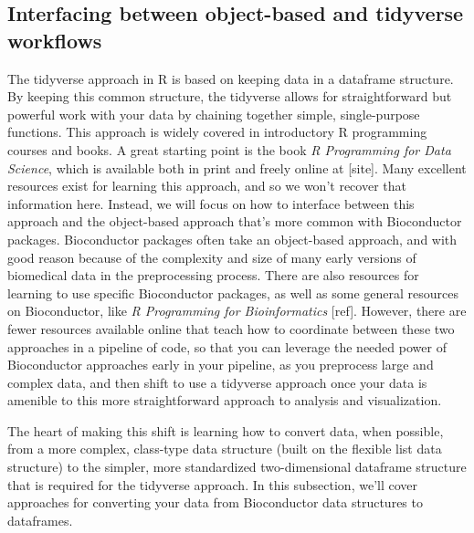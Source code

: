 \documentclass[]{tufte-book}
\begin{document}
\hypertarget{interfacing-between-object-based-and-tidyverse-workflows}{%
\subsection{Interfacing between object-based and tidyverse workflows}\label{interfacing-between-object-based-and-tidyverse-workflows}}

The tidyverse approach in R is based on keeping data in a dataframe structure.
By keeping this common structure, the tidyverse allows for straightforward but
powerful work with your data by chaining together simple, single-purpose
functions. This approach is widely covered in introductory R programming courses
and books. A great starting point is the book \emph{R Programming for Data Science},
which is available both in print and freely online at {[}site{]}. Many excellent
resources exist for learning this approach, and so we won't recover that
information here. Instead, we will focus on how to interface between this
approach and the object-based approach that's more common with Bioconductor
packages. Bioconductor packages often take an object-based approach, and with
good reason because of the complexity and size of many early versions of
biomedical data in the preprocessing process. There are also resources for
learning to use specific Bioconductor packages, as well as some general
resources on Bioconductor, like \emph{R Programming for Bioinformatics} {[}ref{]}.
However, there are fewer resources available online that teach how to coordinate
between these two approaches in a pipeline of code, so that you can leverage the
needed power of Bioconductor approaches early in your pipeline, as you
preprocess large and complex data, and then shift to use a tidyverse approach
once your data is amenible to this more straightforward approach to analysis and
visualization.

The heart of making this shift is learning how to convert data, when possible,
from a more complex, class-type data structure (built on the flexible list
data structure) to the simpler, more standardized two-dimensional dataframe
structure that is required for the tidyverse approach. In this subsection, we'll
cover approaches for converting your data from Bioconductor data structures to
dataframes.
\end{document}
